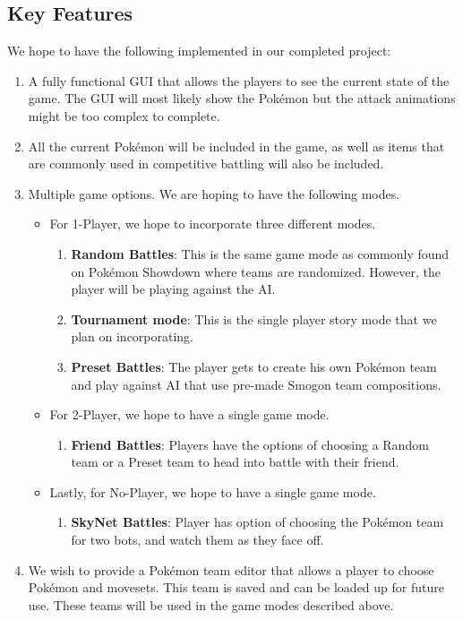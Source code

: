 \documentclass{scrreprt}
\begin{document}
\subsection{Key Features}
We hope to have the following implemented in our completed project:
\begin{enumerate}
	\item A fully functional GUI that allows the players to see the current state of the game. The GUI will most likely show the Pok\'emon but the attack animations might be too complex to complete. 
	\item All the current Pok\'emon will be included in the game, as well as items that are commonly used in competitive battling will also be included.
	\item Multiple game options. We are hoping to have the following modes.
		\begin{itemize}
			\item For 1-Player, we hope to incorporate three different modes. 
				\begin{enumerate}
					\item \textbf{Random Battles}: This is the same game mode as commonly found on Pok\'emon Showdown where teams are randomized. However, the player will be playing against the AI.
					\item \textbf{Tournament mode}: This is the single player story mode that we plan on incorporating.
					\item \textbf{Preset Battles}: The player gets to create his own Pok\'emon team and play against AI that use pre-made Smogon team compositions.
				\end{enumerate}
			\item For 2-Player, we hope to have a single game mode.
				\begin{enumerate}
					\item \textbf{Friend Battles}: Players have the options of choosing a Random team or a Preset team to head into battle with their friend.
				\end{enumerate}
			\item Lastly, for No-Player, we hope to have a single game mode.
				\begin{enumerate}
					\item \textbf{SkyNet Battles}: Player has option of choosing the Pok\'emon team for two bots, and watch them as they face off.
				\end{enumerate}
		\end{itemize}
	\item We wish to provide a Pok\'emon team editor that allows a player to choose Pok\'emon and movesets. This team is saved and can be loaded up for future use. These teams will be used in the game modes described above.

\end{enumerate}
\end{document}
